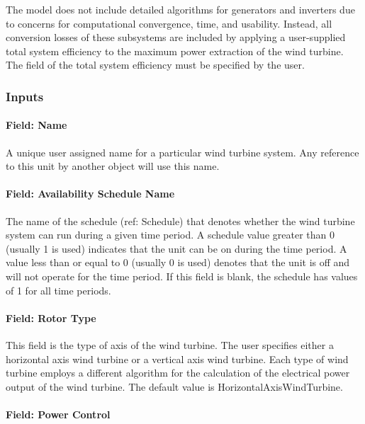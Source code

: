 The model does not include detailed algorithms for generators and inverters due to concerns for computational convergence, time, and usability. Instead, all conversion losses of these subsystems are included by applying a user-supplied total system efficiency to the maximum power extraction of the wind turbine. The field of the total system efficiency must be specified by the user.

\subsubsection{Inputs}\label{inputs-23}

\paragraph{Field: Name}\label{field-name-27}

A unique user assigned name for a particular wind turbine system. Any reference to this unit by another object will use this name.

\paragraph{Field: Availability Schedule Name}\label{field-availability-schedule-name-8-000}

The name of the schedule (ref: Schedule) that denotes whether the wind turbine system can run during a given time period. A schedule value greater than 0 (usually 1 is used) indicates that the unit can be on during the time period. A value less than or equal to 0 (usually 0 is used) denotes that the unit is off and will not operate for the time period. If this field is blank, the schedule has values of 1 for all time periods.

\paragraph{Field: Rotor Type}\label{field-rotor-type}

This field is the type of axis of the wind turbine. The user specifies either a horizontal axis wind turbine or a vertical axis wind turbine. Each type of wind turbine employs a different algorithm for the calculation of the electrical power output of the wind turbine. The default value is HorizontalAxisWindTurbine.

\paragraph{Field: Power Control}\label{field-power-control}

